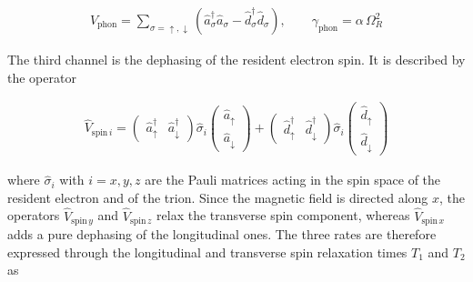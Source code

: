 \documentclass[prb,twocolumn,preprintnumbers,superscriptaddress]{revtex4-2}
\begin{document}
\begin{gather}
    \hat{V}_{\text{phon}} = \sum_{\sigma = \uparrow, \downarrow}
    \left( \hat{a}^{\dag}_{\sigma} \hat{a}_{\sigma}
    - \hat{d}^{\dag}_{\sigma} \hat{d}_{\sigma} \right) , \qquad
    \gamma_{\text{phon}} = \alpha \, \Omega_R^2
    \label{eq:jump-phon}
\end{gather}


The third channel is the dephasing of the resident electron spin.
It is described by the operator


\begin{gather}
    \hat{V}_{\text{spin} \, i} =
\begin{pmatrix}
    \hat{a}^{\dag}_{\uparrow} & \hat{a}^{\dag}_{\downarrow}
\end{pmatrix}
    \hat{\sigma}_i
\begin{pmatrix}
    \hat{a}_{\uparrow} \\
    \hat{a}_{\downarrow}
\end{pmatrix} +
\begin{pmatrix}
    \hat{d}^{\dag}_{\uparrow} & \hat{d}^{\dag}_{\downarrow}
\end{pmatrix}
    \hat{\sigma}_i
\begin{pmatrix}
    \hat{d}_{\uparrow} \\
    \hat{d}_{\downarrow}
\end{pmatrix}
    \label{eq:jump-spin}
\end{gather}

where $\hat{\sigma}_i$ with $i = x, y, z$ are the Pauli matrices acting in the spin
space of the resident electron and of the trion.
Since the magnetic field is directed along $x$, the operators
$\hat{V}_{\text{spin} \, y}$ and $\hat{V}_{\text{spin} \, z}$ relax the transverse
spin component, whereas $\hat{V}_{\text{spin} \, x}$ adds a pure dephasing of the
longitudinal ones.
The three rates are therefore expressed through the longitudinal and transverse spin
relaxation times $T_1$ and $T_2$ as
\end{document}
